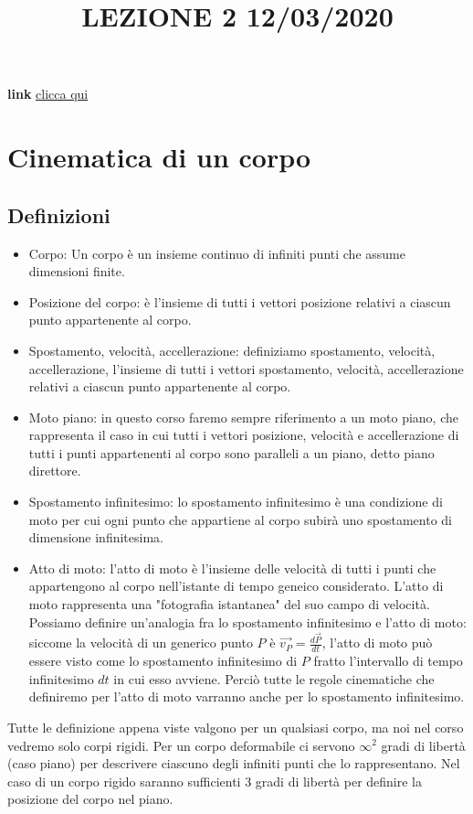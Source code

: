 \title{LEZIONE 2 12/03/2020}\newline
\textbf{link} \href{https://web.microsoftstream.com/video/7f38ca42-5bcf-4a08-b9cf-d42ca1289062}{clicca qui}
\section{Cinematica di un corpo}
\subsection{Definizioni}
\begin{itemize}
    \item Corpo: Un corpo è un insieme continuo di infiniti punti che assume dimensioni finite.
    \item Posizione del corpo: è l'insieme di tutti i vettori posizione relativi a ciascun punto appartenente al corpo.
    \item Spostamento, velocità, accellerazione: definiziamo spostamento, velocità, accellerazione, l'insieme di tutti i vettori spostamento, velocità, accellerazione relativi a ciascun punto appartenente al corpo.
    \item Moto piano: in questo corso faremo sempre riferimento a un moto piano, che rappresenta il caso in cui tutti i vettori posizione, velocità e accellerazione di tutti i punti appartenenti al corpo sono paralleli a un piano, detto piano direttore.
    \item Spostamento infinitesimo: lo spostamento infinitesimo è una condizione di moto per cui ogni punto che appartiene al corpo subirà uno spostamento di dimensione infinitesima.
    \item Atto di moto: l'atto di moto è l'insieme delle velocità di tutti i punti che appartengono al corpo nell'istante di tempo geneico considerato. L'atto di moto rappresenta una "fotografia istantanea" del suo campo di velocità. Possiamo definire un'analogia fra lo spostamento infinitesimo e l'atto di moto: siccome la velocità di un generico punto $P$ è $\vec{v_P} = \frac{d \vec{P}}{dt}$, l'atto di moto può essere visto come lo spostamento infinitesimo di $P$ fratto l'intervallo di tempo infinitesimo $dt$ in cui esso avviene. Perciò tutte le regole cinematiche che definiremo per l'atto di moto varranno anche per lo spostamento infinitesimo.
\end{itemize}
Tutte le definizione appena viste valgono per un qualsiasi corpo, ma noi nel corso vedremo solo corpi rigidi.\newline
Per un corpo deformabile ci servono $\infty^2$ gradi di libertà (caso piano) per descrivere ciascuno degli infiniti punti che lo rappresentano.\newline
Nel caso di un corpo rigido saranno sufficienti $3$ gradi di libertà per definire la posizione del corpo nel piano.
